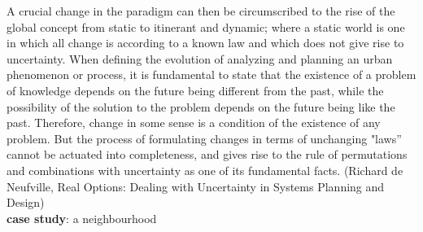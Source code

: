 \documentclass[11pt]{report}
\begin{document}
A crucial change in the  paradigm  can then be circumscribed to the rise of the global concept from static to itinerant and dynamic; where a static world is one in which all change is according to a known law and which does not give rise to uncertainty. When defining the evolution of analyzing and planning an urban phenomenon or process, it is fundamental to state that the existence of a problem of knowledge depends on the future being different from the past, while the possibility of the solution to the problem depends on the future being like the past. Therefore, change in some sense is a condition of the existence of any problem. But the process of formulating changes in terms of unchanging "laws” cannot be actuated into completeness, and gives rise to the rule of permutations and combinations with uncertainty as one of its fundamental facts. (Richard de Neufville, Real Options: Dealing with Uncertainty in Systems Planning and Design)
\\
\textbf{case study}: a neighbourhood
\end{document}
